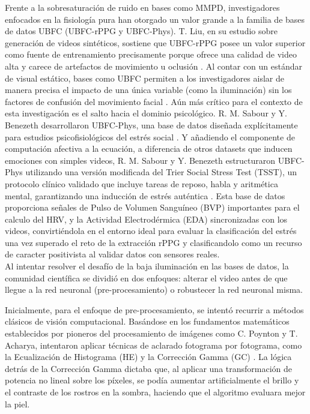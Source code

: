 Frente a la sobresaturación de ruido en bases como MMPD, investigadores enfocados en la fisiología pura han otorgado un valor grande a la familia de bases 
de datos UBFC (UBFC-rPPG y UBFC-Phys). T. Liu, en su estudio sobre generación de videos sintéticos, sostiene que UBFC-rPPG posee un valor superior como 
fuente de entrenamiento precisamente porque ofrece una calidad de video alta y carece de artefactos de movimiento u oclusión \cite{liu2025synrppg}. Al contar con un 
estándar de visual estático, bases como UBFC permiten a los investigadores aislar de manera precisa el impacto de una única variable (como la iluminación) 
sin los factores de confusión del movimiento facial \cite{liu2025synrppg}.
Aún más crítico para el contexto de esta investigación es el salto hacia el dominio psicológico. R. M. Sabour y Y. Benezeth desarrollaron UBFC-Phys, una base de 
datos diseñada explícitamente para estudios psicofisiológicos del estrés social \cite{sabour2023ubfcphys}. Y añadiendo el componente de computación afectiva a la ecuación, a diferencia de otros datasets que inducen emociones con simples videos, 
R. M. Sabour y Y. Benezeth estructuraron UBFC-Phys utilizando una versión modificada del Trier Social Stress Test (TSST), un protocolo clínico validado que incluye tareas de 
reposo, habla y aritmética mental, garantizando una inducción de estrés auténtica \cite{fontes2024enhancing, sabour2023ubfcphys}. Esta base de datos proporciona señales de Pulso de 
Volumen Sanguíneo (BVP) importantes para el calculo del HRV, y la Actividad Electrodérmica (EDA) sincronizadas con los videos, convirtiéndola en el entorno ideal para evaluar la clasificación del 
estrés una vez superado el reto de la extracción rPPG y clasificandolo como un recurso de caracter positivista al validar datos con sensores reales.\\

Al intentar resolver el desafío de la baja iluminación en las bases de datos, la comunidad científica se dividió en dos enfoques: alterar el video antes de que 
llegue a la red neuronal (pre-procesamiento) o robustecer la red neuronal misma.

Inicialmente, para el enfoque de pre-procesamiento, se intentó recurrir a métodos clásicos de visión computacional. Basándose en los fundamentos matemáticos 
establecidos por pioneros del procesamiento de imágenes como C. Poynton y T. Acharya, intentaron aplicar técnicas de aclarado fotograma por 
fotograma, como la Ecualización de Histograma (HE) y la Corrección Gamma (GC) \cite{chen2024image_en}. La lógica detrás de la Corrección Gamma dictaba que, al 
aplicar una transformación de potencia no lineal sobre los píxeles, se podía aumentar artificialmente el brillo y el contraste de los rostros en la sombra, 
haciendo que el algoritmo evaluara mejor la piel.

